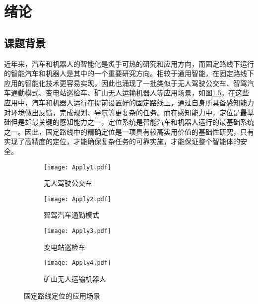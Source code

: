 
\chapter{绪论}



\section{课题背景}
近年来，汽车和机器人的智能化是炙手可热的研究和应用方向，而固定路线下运行的智能汽车和机器人是其中的一个重要研究方向。相较于通用智能，在固定路线下应用的智能化技术更容易实现，因此也涌现了一批类似于无人驾驶公交车\cite{stephen2023driverless}、智驾汽车通勤模式\cite{xin2023xinchuxing}、变电站巡检车\cite{song2020xinhuawang}、矿山无人运输机器人\cite{li2023keji}等应用场景，如图\ref{fig:apply}。在这些应用中，汽车和机器人运行在提前设置好的固定路线上，通过自身所具备感知能力对环境做出反馈，完成规划、导航等更复杂的任务。而在感知能力中，定位是最基础但是却最关键的感知能力之一，定位系统是智能汽车和机器人运行的最基础系统之一。因此，固定路线中的精确定位是一项具有较高实用价值的基础性研究，只有实现了高精度的定位，才能确保复杂任务的可靠实施，才能保证整个智能体的安全。
\begin{figure}[htbp]
  \centering
  \begin{subfigure}[b]{0.45\textwidth}
      \centering
      \texttt{[image: Apply1.pdf]}
      \caption{无人驾驶公交车\cite{stephen2023driverless}}
      \label{fig:apply_sub1}
  \end{subfigure}
  \begin{subfigure}[b]{0.45\textwidth}
      \centering
      \texttt{[image: Apply2.pdf]}
      \caption{智驾汽车通勤模式\cite{xin2023xinchuxing}}
      \label{fig:apply_sub2}
  \end{subfigure}
  \begin{subfigure}[b]{0.45\textwidth}
      \centering
      \texttt{[image: Apply3.pdf]}
      \caption{变电站巡检车\cite{song2020xinhuawang}}
      \label{fig:apply_sub3}
  \end{subfigure}
  \begin{subfigure}[b]{0.45\textwidth}
      \centering
      \texttt{[image: Apply4.pdf]}
      \caption{矿山无人运输机器人\cite{li2023keji}}
      \label{fig:apply_sub4}
  \end{subfigure}

  \caption{固定路线定位的应用场景}
  \label{fig:apply}
\end{figure}

